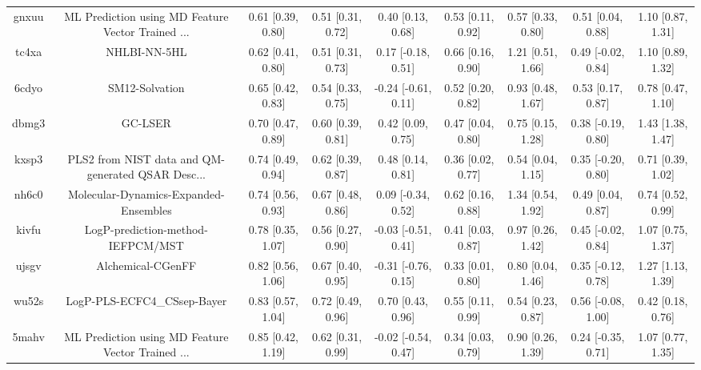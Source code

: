 \documentclass{article}
\begin{document}
\begin{center}
\begin{longtable}{|ccccccccc|}
 gnxuu &  ML Prediction using MD Feature Vector Trained ... &  0.61 [0.39, 0.80] &  0.51 [0.31, 0.72] &     0.40 [0.13, 0.68] &  0.53 [0.11, 0.92] &    0.57 [0.33, 0.80] &    0.51 [0.04, 0.88] &     1.10 [0.87, 1.31] \\
 tc4xa &                                       NHLBI-NN-5HL &  0.62 [0.41, 0.80] &  0.51 [0.31, 0.73] &    0.17 [-0.18, 0.51] &  0.66 [0.16, 0.90] &    1.21 [0.51, 1.66] &   0.49 [-0.02, 0.84] &     1.10 [0.89, 1.32] \\
 6cdyo &                                     SM12-Solvation &  0.65 [0.42, 0.83] &  0.54 [0.33, 0.75] &   -0.24 [-0.61, 0.11] &  0.52 [0.20, 0.82] &    0.93 [0.48, 1.67] &    0.53 [0.17, 0.87] &     0.78 [0.47, 1.10] \\
 dbmg3 &                                            GC-LSER &  0.70 [0.47, 0.89] &  0.60 [0.39, 0.81] &     0.42 [0.09, 0.75] &  0.47 [0.04, 0.80] &    0.75 [0.15, 1.28] &   0.38 [-0.19, 0.80] &     1.43 [1.38, 1.47] \\
 kxsp3 &  PLS2 from NIST data and QM-generated QSAR Desc... &  0.74 [0.49, 0.94] &  0.62 [0.39, 0.87] &     0.48 [0.14, 0.81] &  0.36 [0.02, 0.77] &    0.54 [0.04, 1.15] &   0.35 [-0.20, 0.80] &     0.71 [0.39, 1.02] \\
 nh6c0 &              Molecular-Dynamics-Expanded-Ensembles &  0.74 [0.56, 0.93] &  0.67 [0.48, 0.86] &    0.09 [-0.34, 0.52] &  0.62 [0.16, 0.88] &    1.34 [0.54, 1.92] &    0.49 [0.04, 0.87] &     0.74 [0.52, 0.99] \\
 kivfu &                  LogP-prediction-method-IEFPCM/MST &  0.78 [0.35, 1.07] &  0.56 [0.27, 0.90] &   -0.03 [-0.51, 0.41] &  0.41 [0.03, 0.87] &    0.97 [0.26, 1.42] &   0.45 [-0.02, 0.84] &     1.07 [0.75, 1.37] \\
 ujsgv &                                  Alchemical-CGenFF &  0.82 [0.56, 1.06] &  0.67 [0.40, 0.95] &   -0.31 [-0.76, 0.15] &  0.33 [0.01, 0.80] &    0.80 [0.04, 1.46] &   0.35 [-0.12, 0.78] &     1.27 [1.13, 1.39] \\
 wu52s &                        LogP-PLS-ECFC4\_CSsep-Bayer &  0.83 [0.57, 1.04] &  0.72 [0.49, 0.96] &     0.70 [0.43, 0.96] &  0.55 [0.11, 0.99] &    0.54 [0.23, 0.87] &   0.56 [-0.08, 1.00] &     0.42 [0.18, 0.76] \\
 5mahv &  ML Prediction using MD Feature Vector Trained ... &  0.85 [0.42, 1.19] &  0.62 [0.31, 0.99] &   -0.02 [-0.54, 0.47] &  0.34 [0.03, 0.79] &    0.90 [0.26, 1.39] &   0.24 [-0.35, 0.71] &     1.07 [0.77, 1.35] \\

\end{longtable}
\end{center}
\end{document}
